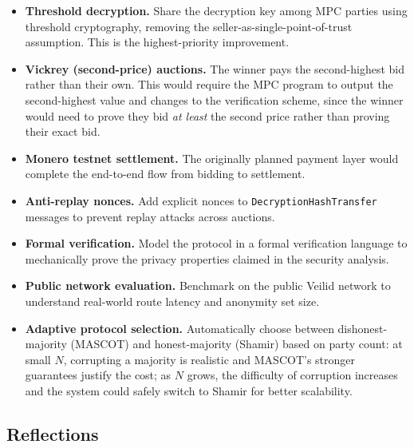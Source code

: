 \begin{itemize}
  \item \textbf{Threshold decryption.}  Share the decryption key among MPC
    parties using threshold cryptography, removing the seller-as-single-point-of-trust
    assumption.  This is the highest-priority improvement.
  \item \textbf{Vickrey (second-price) auctions.}  The winner pays the
    second-highest bid rather than their own.  This would require the MPC
    program to output the second-highest value and changes to the verification
    scheme, since the winner would need to prove they bid \emph{at least} the
    second price rather than proving their exact bid.
  \item \textbf{Monero testnet settlement.}  The originally planned payment
    layer would complete the end-to-end flow from bidding to settlement.
  \item \textbf{Anti-replay nonces.}  Add explicit nonces to
    \texttt{DecryptionHashTransfer} messages to prevent replay attacks
    across auctions.
  \item \textbf{Formal verification.}  Model the protocol in a formal
    verification language to mechanically prove the privacy properties
    claimed in the security analysis.
  \item \textbf{Public network evaluation.}  Benchmark on the public Veilid
    network to understand real-world route latency and anonymity set size.
  \item \textbf{Adaptive protocol selection.}  Automatically choose between
    dishonest-majority (MASCOT) and honest-majority (Shamir) based on party
    count: at small $N$, corrupting a majority is realistic and MASCOT's
    stronger guarantees justify the cost; as $N$ grows, the difficulty of
    corruption increases and the system could safely switch to Shamir for
    better scalability.
\end{itemize}

\subsection{Reflections}
\label{sec:conc-reflections}

